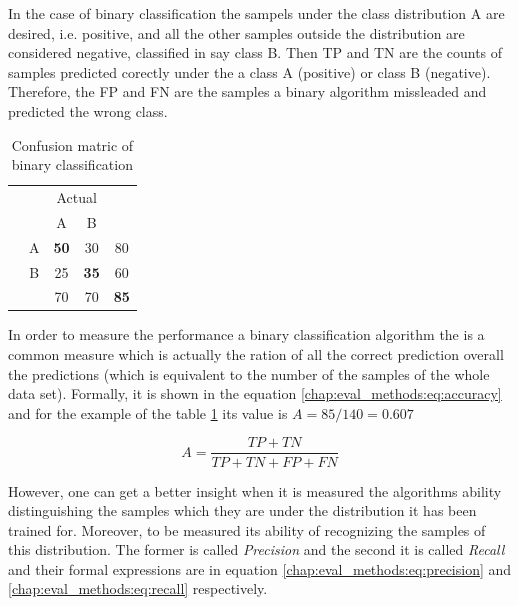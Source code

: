{In the case of binary classification the sampels under the class distribution A are desired, i.e. positive, and all the other samples outside the distribution are considered negative, classified in say class B. Then TP and TN are the counts of samples predicted corectly under the a class A (positive) or class B (negative). Therefore, the FP and FN are the samples a binary algorithm missleaded and predicted the wrong class. 

\begin{table}[H]
	\center
	\caption{Confusion matric of binary classification}\label{chap:eval_methods:tbl:bin_confusion}
	\begin{tabular}{c c c c c}
		& & \multicolumn{2}{c}{Actual} & \\
		\cline{3-4}
		\multirow{3}{*}{\rotatebox[origin=r]{90}{Predicted}} & & \multicolumn{1}{|c}{A} & \multicolumn{1}{c|}{B} & \\
		\cline{2-4}
		& \multicolumn{1}{|c}{A} & \multicolumn{1}{|c}{\textbf{50}} & \multicolumn{1}{c|}{30} & 80 \\
		& \multicolumn{1}{|c}{B} & \multicolumn{1}{|c}{25} & \multicolumn{1}{c|}{\textbf{35}} & 60 \\
		\cline{2-4}
		&  & 70 & 70 & \textbf{85}\\
	\end{tabular}
\end{table}

In order to measure the performance a binary classification algorithm the  is a common measure which is actually the ration of all the correct prediction overall the predictions (which is equivalent to the number of the samples of the whole data set). Formally, it is shown in the equation \ref{chap:eval_methods:eq:accuracy} and for the example of the table \ref{chap:eval_methods:tbl:bin_confusion} its value is $A = 85/140 = 0.607$

\begin{equation}\label{chap:eval_methods:eq:accuracy}
A = \frac {TP + TN} {TP +  TN + FP + FN}
\end{equation}

However, one can get a better insight when it is measured the algorithms ability distinguishing the samples which they are under the distribution it has been trained for. Moreover, to be measured its ability of recognizing the samples of this distribution. The former is called \textit{Precision} and the second it is called \textit{Recall} and their formal expressions are in equation \ref{chap:eval_methods:eq:precision} and \ref{chap:eval_methods:eq:recall} respectively. 

}
